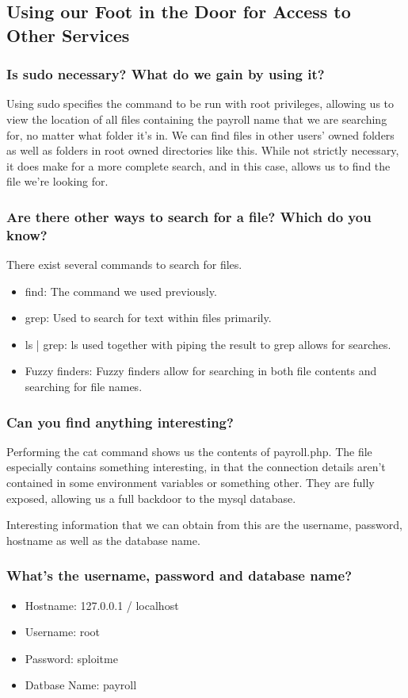 \subsection{Using our Foot in the Door for Access to Other Services}
\subsubsection{Is sudo necessary? What do we gain by using it?}
Using sudo specifies the command to be run with root privileges, allowing us to view the location of all files containing the payroll name that we are searching for, no matter what folder it's in. We can find files in other users' owned folders as well as folders in root owned directories like this. While not strictly necessary, it does make for a more complete search, and in this case, allows us to find the file we're looking for.
\subsubsection{Are there other ways to search for a file? Which do you know?}
There exist several commands to search for files.

\begin{itemize}
  \item find: The command we used previously.
  \item grep: Used to search for text within files primarily.
  \item ls | grep: ls used together with piping the result to grep allows for searches.
  \item Fuzzy finders: Fuzzy finders allow for searching in both file contents and searching for file names.
\end{itemize}

\subsubsection{Can you find anything interesting?}
Performing the cat command shows us the contents of payroll.php. The file especially contains something interesting, in that the connection details aren't contained in some environment variables or something other. They are fully exposed, allowing us a full backdoor to the mysql database.

Interesting information that we can obtain from this are the username, password, hostname as well as the database name.
\subsubsection{What's the username, password and database name?}
\begin{itemize}
  \item Hostname: 127.0.0.1 / localhost
  \item Username: root
  \item Password: sploitme
  \item Datbase Name: payroll
\end{itemize}

